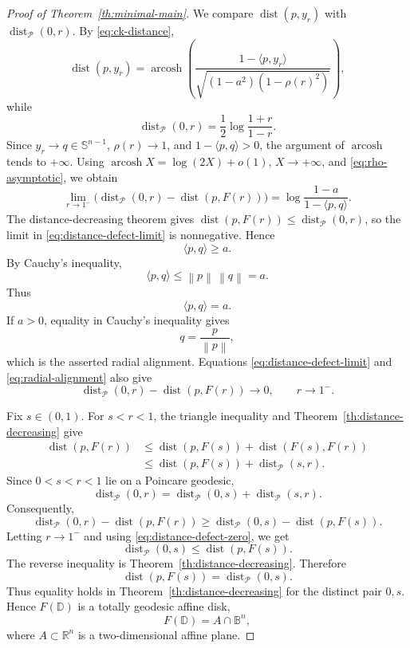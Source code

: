 \documentclass[11pt]{amsart}
\theoremstyle{definition}
\theoremstyle{remark}
\newcommand{\R}{\mathbb R}
\newcommand{\D}{\mathbb D}
\newcommand{\B}{\mathbb B}
\newcommand{\Sph}{\mathbb S}
\newcommand{\inner}[2]{\langle #1,#2\rangle}
\newcommand{\norm}[1]{\left\|#1\right\|}
\newcommand{\dist}{\operatorname{dist}}
\newcommand{\arcosh}{\operatorname{arcosh}}
\begin{document}
\begin{proof}[Proof of Theorem~\ref{th:minimal-main}]
We compare \(\dist(p,y_r)\) with \(\dist_{\mathcal P}(0,r)\). By \eqref{eq:ck-distance},
\[
        \dist(p,y_r)
        =
        \arcosh\left(
        \frac{1-\inner{p}{y_r}}
        {\sqrt{(1-a^2)(1-\rho(r)^2)}}
        \right),
\]
while
\[
        \dist_{\mathcal P}(0,r)=\frac12\log\frac{1+r}{1-r}.
\]
Since \(y_r\to q\in\Sph^{n-1}\), \(\rho(r)\to1\), and \(1-\inner{p}{q}>0\), the argument of \(\arcosh\) tends to \(+\infty\). Using \(\arcosh X=\log(2X)+o(1)\), \(X\to+\infty\), and \eqref{eq:rho-asymptotic}, we obtain
\begin{equation}\label{eq:distance-defect-limit}
        \lim_{r\to1^-}
        \bigl(\dist_{\mathcal P}(0,r)-\dist(p,F(r))\bigr)
        =
        \log\frac{1-a}{1-\inner{p}{q}}.
\end{equation}
The distance-decreasing theorem gives \(\dist(p,F(r))\le\dist_{\mathcal P}(0,r)\), so the limit in \eqref{eq:distance-defect-limit} is nonnegative. Hence
\[
        \inner{p}{q}\ge a.
\]
By Cauchy's inequality,
\[
        \inner{p}{q}\le \norm{p}\,\norm{q}=a.
\]
Thus
\begin{equation}\label{eq:radial-alignment}
        \inner{p}{q}=a.
\end{equation}
If \(a>0\), equality in Cauchy's inequality gives
\[
        q=\frac{p}{\norm{p}},
\]
which is the asserted radial alignment. Equations \eqref{eq:distance-defect-limit} and \eqref{eq:radial-alignment} also give
\begin{equation}\label{eq:distance-defect-zero}
        \dist_{\mathcal P}(0,r)-\dist(p,F(r))\longrightarrow0,
        \qquad r\to1^-.
\end{equation}

Fix \(s\in(0,1)\). For \(s<r<1\), the triangle inequality and Theorem~\ref{th:distance-decreasing} give
\[
\begin{aligned}
        \dist(p,F(r))
        &\le \dist(p,F(s))+\dist(F(s),F(r)) \\
        &\le \dist(p,F(s))+\dist_{\mathcal P}(s,r).
\end{aligned}
\]
Since \(0<s<r<1\) lie on a Poincare geodesic,
\[
        \dist_{\mathcal P}(0,r)
        =\dist_{\mathcal P}(0,s)+\dist_{\mathcal P}(s,r).
\]
Consequently,
\[
        \dist_{\mathcal P}(0,r)-\dist(p,F(r))
        \ge
        \dist_{\mathcal P}(0,s)-\dist(p,F(s)).
\]
Letting \(r\to1^-\) and using \eqref{eq:distance-defect-zero}, we get
\[
        \dist_{\mathcal P}(0,s)
        \le
        \dist(p,F(s)).
\]
The reverse inequality is Theorem~\ref{th:distance-decreasing}. Therefore
\[
        \dist(p,F(s))=\dist_{\mathcal P}(0,s).
\]
Thus equality holds in Theorem~\ref{th:distance-decreasing} for the distinct pair \(0,s\). Hence \(F(\D)\) is a totally geodesic affine disk,
\[
        F(\D)=A\cap\B^n,
\]
where \(A\subset\R^n\) is a two-dimensional affine plane.


\end{proof}
\end{document}
